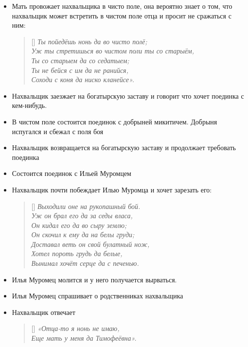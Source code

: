 \documentclass[a4paper, 12pt]{article}
\begin{document}
\begin{itemize}
    \item Мать провожает нахвальщика в чисто поле, она вероятно знает о том, что нахвальщик может встретить в чистом поле отца и просит не сражаться с ним:
    \begin{verse}[\versewidth]
        \itshape
            Ты пойедёшь нонь да во чисто полё;\\
            Уж ты стретишься во чистом поли ты со старыём,\\
            Ты со старыем да со седатыем;\\
            Ты не бейся с им да не ранийся,\\
            Соходи с коня да ниско кланейсе».
        \end{verse}
    \item Нахвальщик заезжает на богатырскую заставу и говорит что хочет поединка с кем-нибудь. 
    \item В чистом поле состоится поединок с добрыней микитичем. Добрыня испугался и сбежал с поля боя
    \item Нахвальщик возвращается на богатырскую заставу и продолжает требовать поединка
    \item Состоится поединок с Ильей Муромцем
    \item Нахвальщик почти побеждает Илью Муромца и хочет зарезать его:
        \begin{verse}[\versewidth]
        \itshape
            Выходили оне на рукопашный бой.\\
            Уж он брал его да за седы власа,\\
            Он кидал его да во сыру землю;\\
            Он скочил к ему да на белы груди;\\
            Доставал веть он свой булатный нож,\\
            Хотел пороть грудь да белые,\\
            Вынимал хочёт серце да с печенью.
        \end{verse}

    \item Илья Муромец молится и у него получается вырваться. 
    \item Илья Муромец спрашивает о родственниках нахвальщика 
    \item Нахвальщик отвечает
        \begin{verse}[\versewidth]
        \itshape
            «Отца-то я нонь не имаю,\\
            Еще мать у меня да Тимофеёвна».
        \end{verse}



\end{itemize}
\end{document}
